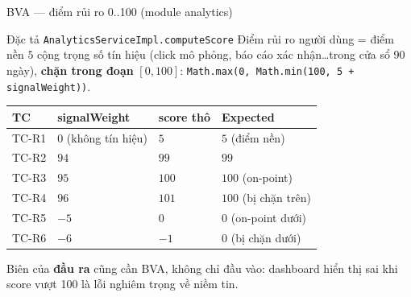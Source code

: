 \documentclass[aspectratio=169,12pt]{beamer}
\begin{document}
\begin{frame}[shrink=6]{BVA --- điểm rủi ro 0..100 (module analytics)}
  \begin{block}{Đặc tả \texttt{AnalyticsServiceImpl.computeScore}}
    Điểm rủi ro người dùng = điểm nền $5$ cộng trọng số tín hiệu
    (click mô phỏng, báo cáo xác nhận\ldots trong cửa sổ 90 ngày),
    \textbf{chặn trong đoạn} $[0, 100]$:
    \texttt{Math.max(0, Math.min(100, 5 + signalWeight))}.
  \end{block}

  \vspace{0.2em}
  \begin{center}
  \small
  \begin{tabular}{llll}
    \toprule
    \textbf{TC} & \textbf{signalWeight} & \textbf{score thô} & \textbf{Expected} \\
    \midrule
    TC-R1 & $0$ (không tín hiệu) & $5$ & $5$ (điểm nền) \\
    TC-R2 & $94$ & $99$ & $99$ \\
    TC-R3 & $95$ & $100$ & $100$ (on-point) \\
    TC-R4 & $96$ & $101$ & $100$ (bị chặn trên) \\
    TC-R5 & $-5$ & $0$ & $0$ (on-point dưới) \\
    TC-R6 & $-6$ & $-1$ & $0$ (bị chặn dưới) \\
    \bottomrule
  \end{tabular}
  \end{center}

  \vspace{0.2em}
  {\small Biên của \textbf{đầu ra} cũng cần BVA, không chỉ đầu vào:
  dashboard hiển thị sai khi score vượt 100 là lỗi nghiêm trọng về niềm tin.}
\end{frame}
\end{document}
